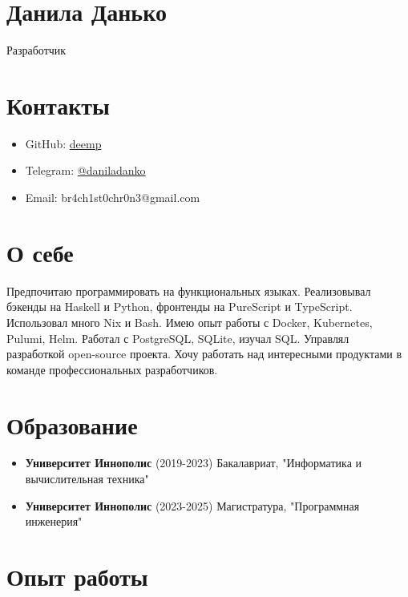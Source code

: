 \documentclass[twocolumn,11pt]{report}
\begin{document}
\thispagestyle{empty}

\section*{\huge Данила Данько}

Разработчик

\section*{Контакты}
\begin{itemize}
     \itemsep0em
     \item GitHub: \href{https://github.com/deemp}{deemp}
     \item Telegram: \href{https://t.me/daniladanko}{@daniladanko}
     \item Email: br4ch1st0chr0n3@gmail.com
\end{itemize}

\section*{О себе}

Предпочитаю программировать на функциональных языках.
Реализовывал бэкенды на Haskell и Python, фронтенды на PureScript и TypeScript.
Использовал много Nix и Bash.
Имею опыт работы с Docker, Kubernetes, Pulumi, Helm.
Работал с PostgreSQL, SQLite, изучал SQL.
Управлял разработкой open-source проекта.
Хочу работать над интересными продуктами в команде профессиональных разработчиков.

\section*{Образование}
\begin{itemize}
     \item \textbf{Университет Иннополис} (2019-2023) \newline
           Бакалавриат, "Информатика и вычислительная техника"
     \item \textbf{Университет Иннополис} (2023-2025) \newline
           Магистратура, "Программная инженерия"

\end{itemize}

\section*{Опыт работы}
\end{document}
